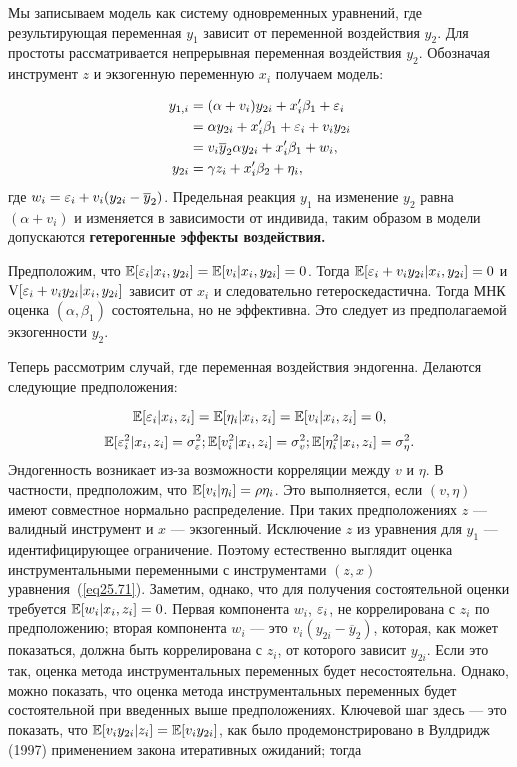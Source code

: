 Мы записываем модель как систему одновременных уравнений, где результирующая переменная $y_1$ зависит от переменной воздействия $y_2$. Для простоты рассматривается непрерывная переменная воздействия $y_2$. Обозначая инструмент $z$ и экзогенную переменную $x_i$ получаем модель:

\begin{align}
\label{eq25.71}
y_{1,i} & = (\alpha + v_i) y_{2i} + x'_i \beta_1 + \varepsilon_i  \\
& = \alpha y_{2i} + x'_i \beta_1 + \varepsilon_i + v_i y_{2i} \nonumber \\
& = v_i \overline{y}_2 \alpha y_{2i} + x'_i \beta_1 + w_i, \nonumber \\
\label{eq25.72}
y_{2i} & = \gamma z_i + x'_i \beta_2 + \eta_i ,
\end{align}
где $w_i = \varepsilon_i + v_i (y_{2i} - \overline{y}_2 )$. Предельная реакция $y_1$ на изменение $y_2$ равна $(\alpha + v_i)$ и изменяется в зависимости от индивида, таким образом в модели допускаются \bfseries гетерогенные эффекты воздействия. \mdseries

Предположим, что $\mathbb{E}[\varepsilon_i | x_i , y_{2i}] = \mathbb{E}[v_i | x_i , y_{2i}] = 0$. Тогда $ \mathbb{E}[\varepsilon_i + v_i y_{2i}| x_i , y_{2i}] = 0$ и $\mathrm{V}[\varepsilon_i + v_i y_{2i}| x_i , y_{2i}]$ зависит от $x_i$ и следовательно гетероскедастична. Тогда МНК оценка $(\alpha, \beta_1)$ состоятельна, но не эффективна. Это следует из предполагаемой экзогенности $y_2$. 

Теперь рассмотрим случай, где переменная воздействия эндогенна. Делаются следующие предположения:

\begin{equation}
\label{eq25.73}
\mathbb{E}[\varepsilon_i | x_i , z_i ] = \mathbb{E} [\eta_i | x_i , z_i] = \mathbb{E} [v_i | x_i , z_i ] = 0,
\end{equation}
\begin{equation}
\label{eq25.74}
\mathbb{E}[\varepsilon_i^2 | x_i , z_i ] = \sigma_{\varepsilon}^2 ; \mathbb{E} [v_i^2 | x_i , z_i] = \sigma_v^2 ; \mathbb{E} [\eta_i^2 | x_i , z_i ] = \sigma_{\eta}^2.
\end{equation}
Эндогенность возникает из-за возможности корреляции между $v$ и $\eta$. В частности, предположим, что $\mathbb{E}[v_i | \eta_i] = \rho \eta_i$. Это выполняется, если $(v,\eta)$ имеют совместное нормально распределение. При таких предположениях $z$ --- валидный инструмент и $x$ --- экзогенный. Исключение $z$ из уравнения для $y_1$ --- идентифицирующее ограничение. Поэтому естественно выглядит оценка инструментальными переменными с инструментами $(z,x)$ уравнения~(\ref{eq25.71}). Заметим, однако, что для получения состоятельной оценки требуется $\mathbb{E}[w_i | x_i, z_i] = 0$. Первая компонента $w_i$, $\varepsilon_i$, не коррелирована с $z_i$ по предположению; вторая компонента $w_i$ --- это $v_i(y_{2i} - \overline{y}_2)$, которая, как может показаться, должна быть коррелирована с $z_i$, от которого зависит $y_{2i}$. Если это так, оценка метода инструментальных переменных будет несостоятельна. Однако, можно показать, что оценка метода инструментальных переменных будет состоятельной при введенных выше предположениях. Ключевой шаг здесь --- это показать, что $\mathbb{E}[v_i y_{2i} | z_i] = \mathbb{E}[v_i y_{2i}]$, как было продемонстрировано в Вулдридж (1997) применением закона итеративных ожиданий; тогда

